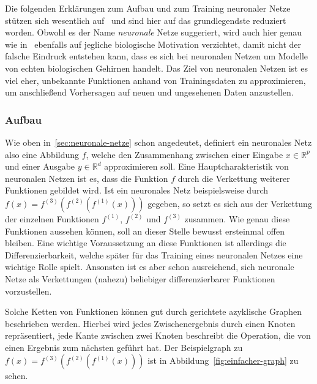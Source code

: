 Die folgenden Erkl\"arungen zum Aufbau und zum Training neuronaler Netze
st\"utzen sich wesentlich auf~\cite{Goodfellow-et-al-2016} und sind hier
auf das grundlegendste reduziert worden.
Obwohl es der Name \textit{neuronale} Netze suggeriert, wird auch hier
genau wie in~\cite{Goodfellow-et-al-2016} ebenfalls auf jegliche
biologische Motivation verzichtet, damit nicht der falsche Eindruck
entstehen kann, dass es sich bei neuronalen Netzen um Modelle von echten
biologischen Gehirnen handelt.
Das Ziel von neuronalen Netzen ist es viel eher, unbekannte Funktionen
anhand von Trainingsdaten zu approximieren, um anschlie{\ss}end Vorhersagen
auf neuen und ungesehenen Daten anzustellen.

\subsubsection{Aufbau}
\label{sec:aufbau}

Wie oben in~\ref{sec:neuronale-netze} schon angedeutet, definiert ein neuronales Netz
also eine Abbildung $f$, welche den Zusammenhang zwischen einer Eingabe $x \in \mathbb{R}^p$
und einer Ausgabe $y \in \mathbb{R}^d$ approximieren soll.
Eine Hauptcharakteristik von neuronalen Netzen ist es, dass die Funktion $f$
durch die Verkettung weiterer Funktionen gebildet wird.
Ist ein neuronales Netz beispielsweise durch
$f(x) = f^{(3)}(f^{(2)}(f^{(1)}(x)))$ gegeben, so setzt es sich aus der
Verkettung der einzelnen Funktionen $f^{(1)}$, $f^{(2)}$ und
$f^{(3)}$ zusammen. Wie genau diese Funktionen aussehen k\"onnen, soll an dieser
Stelle bewusst ersteinmal offen bleiben.
Eine wichtige Voraussetzung an diese Funktionen ist allerdings die
Differenzierbarkeit, welche sp\"ater f\"ur das Training eines neuronalen
Netzes eine wichtige Rolle spielt.
Ansonsten ist es aber schon ausreichend, sich neuronale Netze als
Verkettungen (nahezu) beliebiger differenzierbarer Funktionen vorzustellen.

Solche Ketten von Funktionen k\"onnen gut durch gerichtete
azyklische Graphen beschrieben werden. Hierbei wird jedes Zwischenergebnis
durch einen Knoten repr\"asentiert, jede Kante zwischen zwei Knoten beschreibt
die Operation, die von einen Ergebnis zum n\"achsten gef\"uhrt hat.
Der Beispielgraph zu $f(x) = f^{(3)}(f^{(2)}(f^{(1)}(x)))$ ist in
Abbildung~\ref{fig:einfacher-graph} zu sehen.

